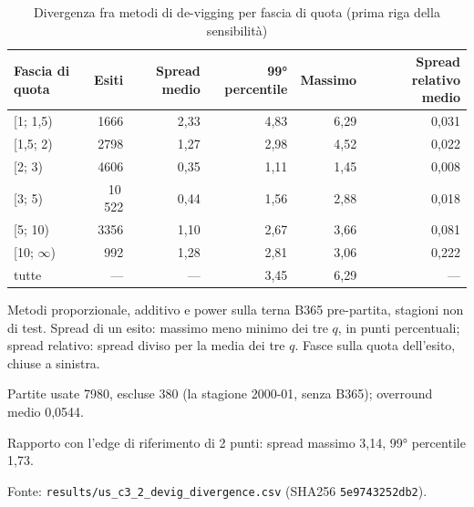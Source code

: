 \begin{table}[htbp]
\centering
\small
\caption{Divergenza fra metodi di de-vigging per fascia di quota (prima riga della sensibilità)}
\label{tab:c3_2_divergenza_devig}
\begin{tabular}{lrrrrr}
\toprule
Fascia di quota & Esiti & Spread medio & 99° percentile & Massimo & Spread relativo medio \\
\midrule
[1; 1,5) & 1666 & 2,33 & 4,83 & 6,29 & 0,031 \\
[1,5; 2) & 2798 & 1,27 & 2,98 & 4,52 & 0,022 \\
[2; 3) & 4606 & 0,35 & 1,11 & 1,45 & 0,008 \\
[3; 5) & 10\,522 & 0,44 & 1,56 & 2,88 & 0,018 \\
[5; 10) & 3356 & 1,10 & 2,67 & 3,66 & 0,081 \\
[10; $\infty$) & 992 & 1,28 & 2,81 & 3,06 & 0,222 \\
tutte & --- & --- & 3,45 & 6,29 & --- \\
\bottomrule
\end{tabular}

\smallskip
\begin{minipage}{\linewidth}
\footnotesize
Metodi proporzionale, additivo e power sulla terna B365 pre-partita, stagioni non di test. Spread di un esito: massimo meno minimo dei tre $q$, in punti percentuali; spread relativo: spread diviso per la media dei tre $q$. Fasce sulla quota dell'esito, chiuse a sinistra.\par
Partite usate 7980, escluse 380 (la stagione 2000-01, senza B365); overround medio 0,0544.\par
Rapporto con l'edge di riferimento di 2 punti: spread massimo 3,14, 99° percentile 1,73.\par
Fonte: \texttt{results/us\_c3\_2\_devig\_divergence.csv} (SHA256 \texttt{5e9743252db2}).
\end{minipage}
\end{table}

